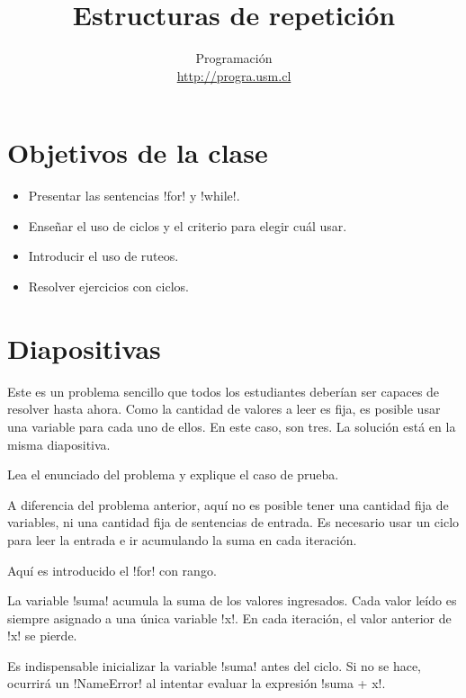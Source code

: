 \documentclass[10pt]{article}
\title{Estructuras de repetición}
\author{Programación \\ \url{http://progra.usm.cl}}
\date{}
\begin{document}
  \maketitle

  \section*{Objetivos de la clase}
  \begin{itemize}
    \item Presentar las sentencias \li!for! y \li!while!.
    \item Enseñar el uso de ciclos y el criterio para elegir cuál usar.
    \item Introducir el uso de ruteos.
    \item Resolver ejercicios con ciclos.
  \end{itemize}

  \section*{Diapositivas}


  Este es un problema sencillo que todos los estudiantes
  deberían ser capaces de resolver hasta ahora.
  Como la cantidad de valores a leer es fija,
  es posible usar una variable para cada uno de ellos.
  En este caso, son tres.
  La solución está en la misma diapositiva.


  Lea el enunciado del problema y explique el caso de prueba.

  A diferencia del problema anterior,
  aquí no es posible tener una cantidad fija de variables,
  ni una cantidad fija de sentencias de entrada.
  Es necesario usar un ciclo
  para leer la entrada
  e ir acumulando la suma en cada iteración.


  Aquí es introducido el \li!for! con rango.

  La variable \li!suma! acumula la suma de los valores ingresados.
  Cada valor leído es siempre asignado a una única variable \li!x!.
  En cada iteración, el valor anterior de \li!x! se pierde.

  Es indispensable inicializar la variable \li!suma! antes del ciclo.
  Si no se hace, ocurrirá un \li!NameError!
  al intentar evaluar la expresión \li!suma + x!.
\end{document}
